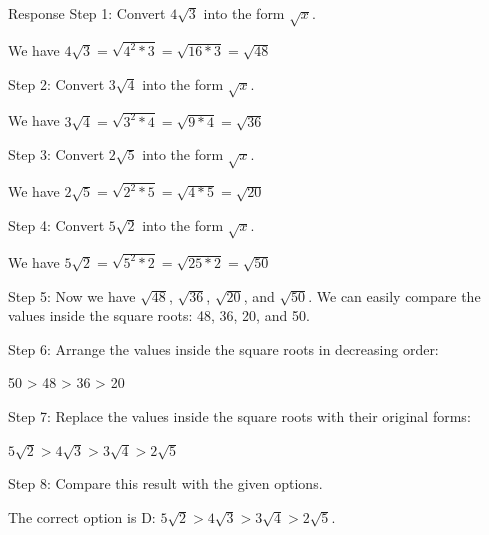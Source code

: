 \documentclass[
    a4paper, %
    10pt, %
    twoside, %
]{LTJournalArticle}
\begin{document}
\begin{llmbox}{Response}
    Step 1: Convert $4\sqrt{3}$ into the form $\sqrt{x}$.

    We have $4\sqrt{3} = \sqrt{4^2 * 3} = \sqrt{16 * 3} = \sqrt{48}$
    
    \vspace{1em}

    Step 2: Convert $3\sqrt{4}$ into the form $\sqrt{x}$.

    We have $3\sqrt{4} = \sqrt{3^2 * 4} = \sqrt{9 * 4} = \sqrt{36}$
    
    \vspace{1em}

    Step 3: Convert $2\sqrt{5}$ into the form $\sqrt{x}$.

    We have $2\sqrt{5} = \sqrt{2^2 * 5} = \sqrt{4 * 5} = \sqrt{20}$
    
    \vspace{1em}

    Step 4: Convert $5\sqrt{2}$ into the form $\sqrt{x}$.

    We have $5\sqrt{2} = \sqrt{5^2 * 2} = \sqrt{25 * 2} = \sqrt{50}$
    
    \vspace{1em}

    Step 5: Now we have $\sqrt{48}$, $\sqrt{36}$, $\sqrt{20}$, and $\sqrt{50}$. We can easily compare the values inside the square roots: 48, 36, 20, and 50.

    \vspace{1em}

    Step 6: Arrange the values inside the square roots in decreasing order:

    50 > 48 > 36 > 20

    \vspace{1em}

    Step 7: Replace the values inside the square roots with their original forms:

    $5\sqrt{2} > 4\sqrt{3} > 3\sqrt{4} > 2\sqrt{5}$

    \vspace{1em}

    Step 8: Compare this result with the given options.

    The correct option is D: $5\sqrt{2} > 4\sqrt{3} > 3\sqrt{4} > 2\sqrt{5}$.
\end{llmbox}
\end{document}
